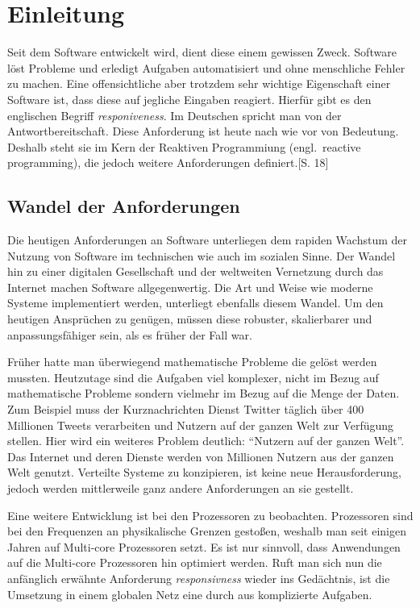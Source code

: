 \chapter{Einleitung}\label{sec:einleitung}

Seit dem Software entwickelt wird, dient diese einem gewissen Zweck. Software löst Probleme und erledigt Aufgaben automatisiert und ohne menschliche Fehler zu machen. Eine offensichtliche aber trotzdem sehr wichtige Eigenschaft einer Software ist, dass diese auf jegliche Eingaben reagiert. Hierfür gibt es den englischen Begriff \textit{responiveness}. Im Deutschen spricht man von der Antwortbereitschaft. Diese Anforderung ist heute nach wie vor von Bedeutung. Deshalb steht sie im Kern der Reaktiven Programmiung (engl.\ reactive programming), die jedoch weitere Anforderungen definiert.\cite{kuhn_reactive_2015}[S. 18]

\section{Wandel der Anforderungen}
Die heutigen Anforderungen an Software unterliegen dem rapiden Wachstum der Nutzung von Software im technischen wie auch im sozialen Sinne. Der Wandel hin zu einer digitalen Gesellschaft und der weltweiten Vernetzung durch das Internet machen Software allgegenwertig. Die Art und Weise wie moderne Systeme implementiert werden, unterliegt ebenfalls diesem Wandel. Um den heutigen Ansprüchen zu genügen, müssen diese robuster, skalierbarer und anpassungsfähiger sein, als es früher der Fall war.\cite{boner_reactive_2014}

Früher hatte man überwiegend mathematische Probleme die gelöst werden mussten. Heutzutage sind die Aufgaben viel komplexer, nicht im Bezug auf mathematische Probleme sondern vielmehr im Bezug auf die Menge der Daten. Zum Beispiel muss der Kurznachrichten Dienst Twitter täglich über 400 Millionen Tweets verarbeiten und Nutzern auf der ganzen Welt zur Verfügung stellen. Hier wird ein weiteres Problem deutlich: \enquote{Nutzern auf der ganzen Welt}. Das Internet und deren Dienste werden von Millionen Nutzern aus der ganzen Welt genutzt. Verteilte Systeme zu konzipieren, ist keine neue Herausforderung, jedoch werden mittlerweile ganz andere Anforderungen an sie gestellt.

Eine weitere Entwicklung ist bei den Prozessoren zu beobachten. Prozessoren sind bei den Frequenzen an physikalische Grenzen gestoßen, weshalb man seit einigen Jahren auf Multi-core Prozessoren setzt. Es ist nur sinnvoll, dass Anwendungen auf die Multi-core Prozessoren hin optimiert werden. Ruft man sich nun die anfänglich erwähnte Anforderung \textit{responsivness} wieder ins Gedächtnis, ist die Umsetzung in einem globalen Netz eine durch aus komplizierte Aufgaben.

